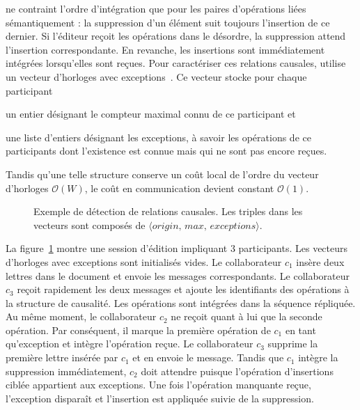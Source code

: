 
\CRATE ne contraint l'ordre d'intégration que pour les paires d'opérations liées
sémantiquement : la suppression d'un élément suit toujours l'insertion de ce
dernier. Si l'éditeur reçoit les opérations dans le désordre, la suppression
attend l'insertion correspondante. En revanche, les insertions sont
immédiatement intégrées lorsqu'elles sont reçues. Pour caractériser ces
relations causales, \CRATE utilise un vecteur d'horloges avec
exceptions~\cite{malkhi2007concise, mukund2014optimized}. Ce vecteur stocke pour
chaque participant
\begin{inparaenum}
\item un entier désignant le compteur maximal connu de ce participant et
\item une liste d'entiers désignant les exceptions, à savoir les opérations de
  ce participants dont l'existence est connue mais qui ne sont pas encore
  reçues.
\end{inparaenum}
Tandis qu'une telle structure conserve un coût local de l'ordre du vecteur
d'horloges $\mathcal{O}(W)$, le coût en communication devient constant
$\mathcal{O}(1)$.

\begin{figure}
  \begin{center}
    
    \caption[Exemple de détection de relations causales]
    {\label{editor:fig:timeline}Exemple de détection de relations causales. Les
      triples dans les vecteurs sont composés de
      $\langle origin,\, max,\, exceptions\rangle$.}
  \end{center}
\end{figure}

La figure~\ref{editor:fig:timeline} montre une session d'édition impliquant 3
participants. Les vecteurs d'horloges avec exceptions sont initialisés vides. Le
collaborateur $c_1$ insère deux lettres dans le document et envoie les messages
correspondants. Le collaborateur $c_3$ reçoit rapidement les deux messages et
ajoute les identifiants des opérations à la structure de causalité. Les
opérations sont intégrées dans la séquence répliquée. Au même moment, le
collaborateur $c_2$ ne reçoit quant à lui que la seconde opération. Par
conséquent, il marque la première opération de $c_1$ en tant qu'exception et
intègre l'opération reçue. Le collaborateur $c_3$ supprime la première lettre
insérée par $c_1$ et en envoie le message. Tandis que $c_1$ intègre la
suppression immédiatement, $c_2$ doit attendre puisque l'opération d'insertions
ciblée appartient aux exceptions. Une fois l'opération manquante reçue,
l'exception disparaît et l'insertion est appliquée suivie de la suppression.

